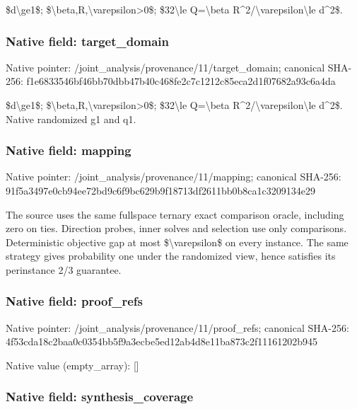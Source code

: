 \documentclass[10pt,a4paper]{article}
\begin{document}
\$d\textbackslash{}ge1\$; \$\textbackslash{}beta,R,\textbackslash{}varepsilon>0\$; \$32\textbackslash{}le Q=\textbackslash{}beta R\textasciicircum{}2/\textbackslash{}varepsilon\textbackslash{}le d\textasciicircum{}2\$.


\subsubsection{Native field: target\_domain}


Native pointer: /joint\_analysis/provenan\allowbreak{}ce/11/target\_domain; canonical SHA-256: f1e6833546bf46bb70dbb47b\allowbreak{}40c468fe2c7c1212c85eca2d\allowbreak{}1f07682a93c6a4da


\$d\textbackslash{}ge1\$; \$\textbackslash{}beta,R,\textbackslash{}varepsilon>0\$; \$32\textbackslash{}le Q=\textbackslash{}beta R\textasciicircum{}2/\textbackslash{}varepsilon\textbackslash{}le d\textasciicircum{}2\$. Native randomized g1 and q1.


\subsubsection{Native field: mapping}


Native pointer: /joint\_analysis/provenance/11/mapping; canonical SHA-256: 91f5a3497e0cb94ee72bd9c6\allowbreak{}f9bc629b9f18713df2611bb0\allowbreak{}b8ca1c3209134e29


The source uses the same fullspace ternary exact comparison oracle, including zero on ties. Direction probes, inner solves and selection use only comparisons. Deterministic objective gap at most \$\textbackslash{}varepsilon\$ on every instance. The same strategy gives probability one under the randomized view, hence satisfies its perinstance 2/3 guarantee.


\subsubsection{Native field: proof\_refs}


Native pointer: /joint\_analysis/provenan\allowbreak{}ce/11/proof\_refs; canonical SHA-256: 4f53cda18c2baa0c0354bb5f\allowbreak{}9a3ecbe5ed12ab4d8e11ba87\allowbreak{}3c2f11161202b945



Native value (empty\_array): []



\subsubsection{Native field: synthesis\_coverage}
\end{document}
